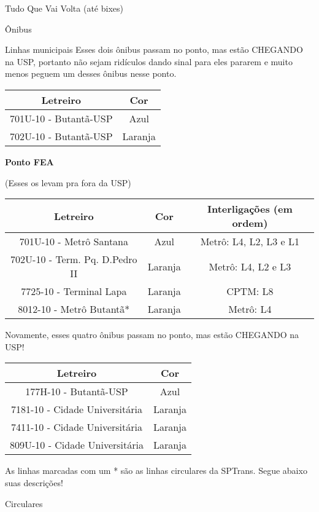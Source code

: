 \begin{secao}{Tudo Que Vai Volta (até bixes)}
\begin{subsecao}{Ônibus}
\begin{subsubsecao}{Linhas municipais}
Esses dois ônibus passam no ponto, mas estão CHEGANDO na USP, portanto não sejam
ridículos dando sinal para eles pararem e muito menos peguem um desses ônibus
nesse ponto.

\begin{center}
	\begin{tabular}{|c|c|}
	  \hline
	  Letreiro & Cor\\
	  \hline
	  701U-10 - Butantã-USP & Azul\\
	  702U-10 - Butantã-USP & Laranja\\
	  \hline
	\end{tabular}
\end{center}

{\bf Ponto FEA}

(Esses os levam pra fora da USP)
\begin{center}
	\begin{tabular}{|c|c|c|}
      \hline
	  Letreiro & Cor & Interligações (em ordem)\\
	  \hline
	  701U-10 - Metrô Santana & Azul & Metrô: L4, L2, L3 e L1\\
	  702U-10 - Term. Pq. D.Pedro II & Laranja & Metrô: L4, L2 e L3\\
	  7725-10 - Terminal Lapa & Laranja & CPTM: L8\\
	  8012-10 - Metrô Butantã* & Laranja & Metrô: L4\\
      \hline
	\end{tabular}
\end{center}

Novamente, esses quatro ônibus passam no ponto, mas estão CHEGANDO na USP!
\begin{center}
	\begin{tabular}{|c|c|}
	  \hline
	  Letreiro & Cor\\
	  \hline
	  177H-10 - Butantã-USP & Azul\\
	  7181-10 - Cidade Universitária & Laranja\\
	  7411-10 - Cidade Universitária & Laranja\\
	  809U-10 - Cidade Universitária & Laranja\\
	  \hline
	\end{tabular}
\end{center}

As linhas marcadas com um * são as linhas circulares da SPTrans. Segue abaixo suas descrições!

\end{subsubsecao}

\begin{subsubsecao}{Circulares}


\end{subsubsecao}
\end{subsecao}
\end{secao}
